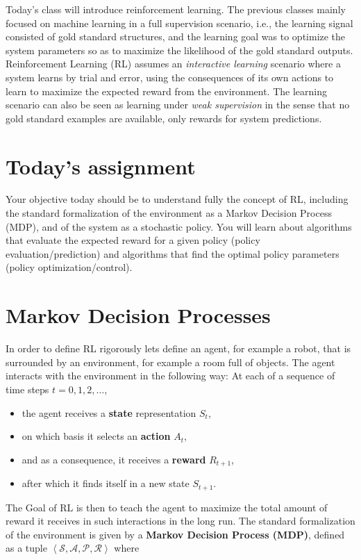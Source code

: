 Today's class will introduce reinforcement learning. The previous classes
mainly focused on machine learning in a full supervision scenario, i.e., the
learning signal consisted of gold standard structures, and the learning goal
was to optimize the system parameters so as to maximize the likelihood of the
gold standard outputs.
    Reinforcement Learning (RL) assumes an \emph{interactive learning} scenario where a system learns by trial and error, using the consequences of its own actions to learn to maximize the expected reward from the environment.
    The learning scenario can also be seen as learning under \emph{weak supervision} in the sense that no gold standard examples are available, only rewards for system predictions.

\section{Today's assignment}

Your objective today should be to understand fully the concept of RL, including
the standard formalization of the environment as a Markov Decision Process
(MDP), and of the system as a stochastic policy. You will learn about
algorithms that evaluate the expected reward for a given policy (policy
evaluation/prediction) and algorithms that find the optimal policy parameters
(policy optimization/control). 

\section{Markov Decision Processes}

In order to define RL rigorously lets define an agent, for example a robot,
that is surrounded by an environment, for example a room full of objects. The
agent interacts with the environment in the following way: At each of a
sequence of time steps $t = 0,1,2,\ldots$,

\begin{itemize}
  \item the agent receives a \textbf{state} representation $S_t$,
  \item on which basis it selects an \textbf{action} $A_t$,
  \item and as a consequence, it receives a \textbf{reward} $R_{t+1}$,
  \item after which it finds itself in a new state $S_{t+1}$.
\end{itemize}

The Goal of RL is then to teach the agent to maximize the total amount of
reward it receives in such interactions in the long run. The standard
formalization of the environment is given by a \textbf{Markov Decision Process
(MDP)}, defined as a tuple $\left< \mathcal{S}, \mathcal{A}, \mathcal{P},
\mathcal{R} \right>$ where

